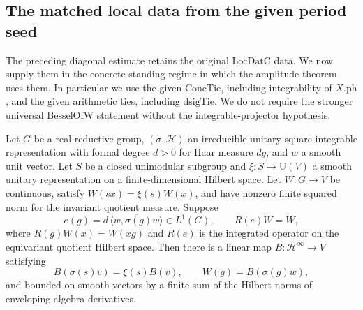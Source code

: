 \subsection{The matched local data from the given period seed}
\label{sec:flag-local-data}

The preceding diagonal estimate retains the original
\(\mathrm{LocDatC}\) data. We now supply them in the concrete
standing regime in which the amplitude theorem uses them.
In particular we use the given
\(\mathrm{ConcTie}\), including integrability of \(X.\mathrm{ph}\),
and the given arithmetic ties, including \(\mathrm{dsigTie}\).
We do not require the stronger universal \(\mathrm{BesselOfW}\)
statement without the integrable-projector hypothesis.

\begin{lemma}
\label{lem:flag-bessel-extraction}
Let \(G\) be a real reductive group, \((\sigma,\mathcal H)\)
an irreducible unitary square-integrable representation with
formal degree \(d>0\) for Haar measure \(dg\), and \(w\) a
smooth unit vector. Let \(S\) be a closed unimodular subgroup
and \(\xi:S\to\mathrm U(V)\) a smooth unitary representation
on a finite-dimensional Hilbert space. Let \(W:G\to V\) be
continuous, satisfy \(W(sx)=\xi(s)W(x)\), and have nonzero
finite squared norm for the invariant quotient measure.
Suppose
\[
 e(g)=d\,\overline{\langle w,\sigma(g)w\rangle}\in L^1(G),
 \qquad R(e)W=W ,
 \tag{LD1}
\]
where \(R(g)W(x)=W(xg)\) and \(R(e)\) is the integrated
operator on the equivariant quotient Hilbert space.
Then there is a linear map \(B:\mathcal H^\infty\to V\)
satisfying
\[
 B(\sigma(s)v)=\xi(s)B(v),\qquad
 W(g)=B(\sigma(g)w),
\]
and bounded on smooth vectors by a finite sum of the
Hilbert norms of enveloping-algebra derivatives.
\end{lemma}

